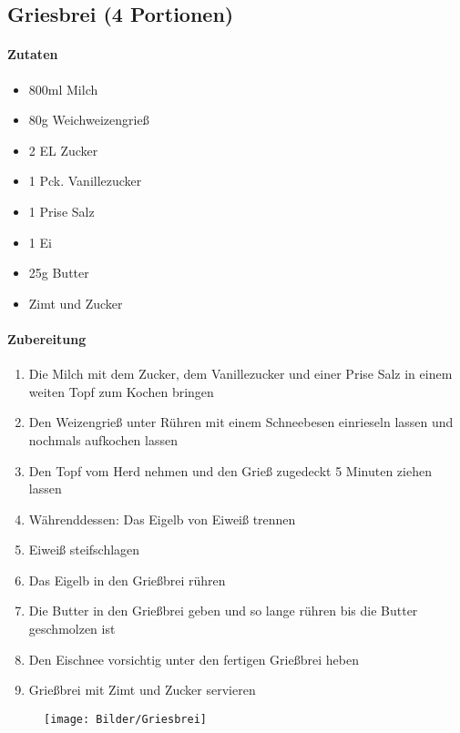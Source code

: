 \newpage
\subsection{Griesbrei (4 Portionen)}
\paragraph{Zutaten}
\begin{itemize}[noitemsep]
	\item 800ml Milch
	\item 80g Weichweizengrieß
	\item 2 EL Zucker
	\item 1 Pck. Vanillezucker
	\item 1 Prise Salz
	\item 1 Ei
	\item 25g Butter
	\item Zimt und Zucker
\end{itemize}
\paragraph{Zubereitung}
\begin{enumerate}[noitemsep]
	\item Die Milch mit dem Zucker, dem Vanillezucker und einer Prise Salz in einem weiten Topf zum Kochen bringen
	\item Den Weizengrieß unter Rühren mit einem Schneebesen einrieseln lassen und nochmals aufkochen lassen
	\item Den Topf vom Herd nehmen und den Grieß zugedeckt 5 Minuten ziehen lassen
	\item Währenddessen: Das Eigelb von Eiweiß trennen 
	\item Eiweiß steifschlagen 
	\item Das Eigelb in den Grießbrei rühren
	\item Die Butter in den Grießbrei geben und so lange rühren bis die Butter geschmolzen ist
	\item Den Eischnee vorsichtig unter den fertigen Grießbrei heben
	\item Grießbrei mit Zimt und Zucker servieren
\end{enumerate}
\begin{figure}[h]
\centering
\texttt{[image: Bilder/Griesbrei]}
\end{figure}